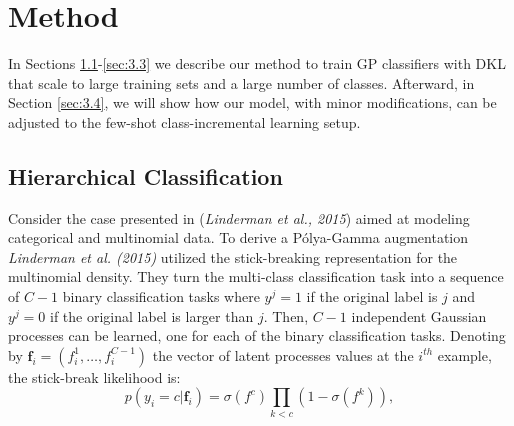 \documentclass[preprint,11pt]{elsarticle}
\begin{document}
    \section{Method}
    \label{sec:3}
    In Sections \ref{sec:3.1}-\ref{sec:3.3} we describe our method to train GP
    classifiers with DKL that scale to large training sets and
    a large number of classes. Afterward, in Section \ref{sec:3.4}, we
    will show how our model, with minor modifications, can be
    adjusted to the few-shot class-incremental learning setup.
        \subsection{Hierarchical Classification}
        \label{sec:3.1}
        Consider the case presented in (\textit{Linderman et al., 2015}\cite{linderman2015dependent})
        aimed at modeling categorical and multinomial data. To derive
        a Pólya-Gamma augmentation \textit{Linderman et al. (2015)}\cite{linderman2015dependent}
        utilized the stick-breaking representation for the multinomial
        density. They turn the multi-class classification task
        into a sequence of $C - 1$ binary classification tasks where
        $y^j = 1$ if the original label is $j$ and $y^j = 0$ if the original
        label is larger than $j$. Then, $C - 1$ independent Gaussian
        processes can be learned, one for each of the binary classification
        tasks. Denoting by $\bm{f}_i = (f_i^1, \ldots , f_i^{C-1} )$ the vector of
        latent processes values at the $i^{th}$ example, the stick-break
        likelihood is:
        \begin{equation}
            p( y_i = c|\bm{f}_i ) = \sigma( f^c ) \prod_{k<c} ( 1-\sigma( f^k )  ),
        \end{equation}
\end{document}
